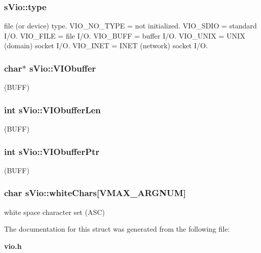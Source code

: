 \subsubsection[{type}]{ s\+Vio\+::type}\label{a00002_a10ff01c784656edf59de7290943d2bb8}
file (or device) type. V\+I\+O\+\_\+\+N\+O\+\_\+\+T\+Y\+P\+E = not initialized. V\+I\+O\+\_\+\+S\+D\+I\+O = standard I/\+O. V\+I\+O\+\_\+\+F\+I\+L\+E = file I/\+O. V\+I\+O\+\_\+\+B\+U\+F\+F = buffer I/\+O. V\+I\+O\+\_\+\+U\+N\+I\+X = U\+N\+I\+X (domain) socket I/\+O. V\+I\+O\+\_\+\+I\+N\+E\+T = I\+N\+E\+T (network) socket I/\+O. 
\subsubsection[{V\+I\+Obuffer}]{\setlength{\rightskip}{0pt plus 5cm}char$\ast$ s\+Vio\+::\+V\+I\+Obuffer}\label{a00002_ad05a71a18ce91d54c9e90f6f24a6e0d5}
(B\+U\+F\+F) 
\subsubsection[{V\+I\+Obuffer\+Len}]{\setlength{\rightskip}{0pt plus 5cm}int s\+Vio\+::\+V\+I\+Obuffer\+Len}\label{a00002_aaa457bd84691d96861e3c7792006517c}
(B\+U\+F\+F) 
\subsubsection[{V\+I\+Obuffer\+Ptr}]{\setlength{\rightskip}{0pt plus 5cm}int s\+Vio\+::\+V\+I\+Obuffer\+Ptr}\label{a00002_a615098ef767bb9dd01bd2629b1b8d8be}
(B\+U\+F\+F) 
\subsubsection[{white\+Chars}]{\setlength{\rightskip}{0pt plus 5cm}char s\+Vio\+::white\+Chars[{\bf V\+M\+A\+X\+\_\+\+A\+R\+G\+N\+U\+M}]}\label{a00002_aa478abe4d4059c9b597ffc3181b9460e}
white space character set (A\+S\+C) 

The documentation for this struct was generated from the following file\+:\begin{DoxyCompactItemize}
\item 
{\bf vio.\+h}\end{DoxyCompactItemize}
